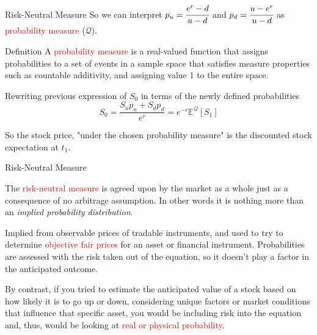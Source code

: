 \documentclass{beamer}
\begin{document}
\begin{frame}{Risk-Neutral Measure}
So we can interpret $p_u=\cfrac{e^r -d}{u-d}$ and $p_d=\cfrac{u - e^r}{u-d}$ as \textcolor{red}{probability measure} ($\mathcal{Q}$).\vspace{0.3cm}
\pause
\begin{block}{Definition}
	A \textcolor{red}{probability measure} is a real-valued function that assigns probabilities to a set of events in a sample space that satisfies measure properties such as countable additivity, and assigning value 1 to the entire space.
\end{block}	
\pause
Rewriting previous expression of $S_0$ in terms of the newly defined probabilities
\begin{equation}
S_0 = \frac{S_up_u + S_dp_d}{e^r} = e^{-r}\mathbb{E}^\mathcal{Q}[S_1]
\label{eq:risk_neutral_price}
\end{equation}

So the stock price, "under the chosen probability measure" is the discounted stock expectation at $t_1$.
\end{frame}

\begin{frame}{Risk-Neutral Measure}

The \textcolor{red}{risk-neutral measure} is agreed upon by the market as a whole just as a consequence of no arbitrage assumption.
In other words it is nothing more than an \emph{implied probability distribution}.
\pause

Implied from observable prices of tradable instruments, and used to try to determine \textcolor{red}{objective fair prices} for an asset or financial instrument. Probabilities are assessed with the risk taken out of the equation, so it doesn’t play a factor in the anticipated outcome.
\pause

By contrast, if you tried to estimate the anticipated value of a stock based on how likely it is to go up or down, considering unique factors or market conditions that influence that specific asset, you would be including risk into the equation and, thus, would be looking at \textcolor{red}{real or physical probability}.
\end{frame}
\end{document}
